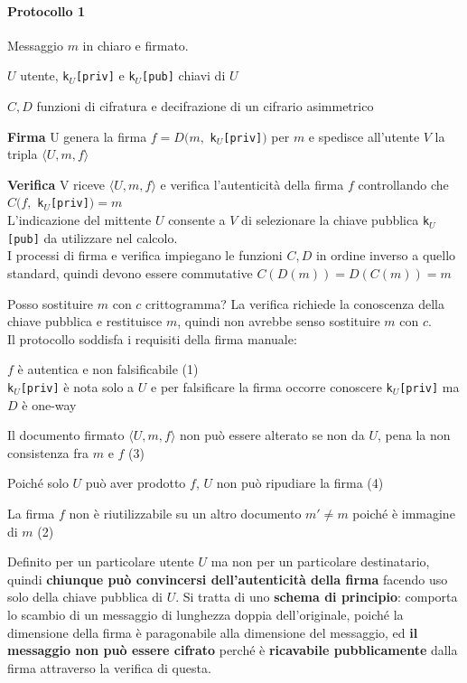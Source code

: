 \documentclass[10pt]{book}
\begin{document}
\paragraph{Protocollo 1} Messaggio $m$ in chiaro e firmato.
\begin{list}{}{}
	\item $U$ utente, \texttt{k$_U$[priv]} e \texttt{k$_U$[pub]} chiavi di $U$
	\item $C,D$ funzioni di cifratura e decifrazione di un cifrario asimmetrico
	\item \textbf{Firma} U genera la firma $f = D(m,$ \texttt{k$_U$[priv]}$)$ per $m$ e spedisce all'utente $V$ la tripla $\langle U,m,f\rangle$
	\pagebreak
	\item \textbf{Verifica} V riceve $\langle U,m,f\rangle$ e verifica l'autenticità della firma $f$ controllando che $C(f,$ \texttt{k$_U$[priv]}$) = m$\\
	L'indicazione del mittente $U$ consente a $V$ di selezionare la chiave pubblica \texttt{k$_U$[pub]} da utilizzare nel calcolo.\\
I processi di firma e verifica impiegano le funzioni $C,D$ in ordine inverso a quello standard, quindi devono essere commutative $C(D(m)) = D(C(m)) = m$	
\end{list}
Posso sostituire $m$ con $c$ crittogramma? La verifica richiede la conoscenza della chiave pubblica e restituisce $m$, quindi non avrebbe senso sostituire $m$ con $c$.\\
Il protocollo soddisfa i requisiti della firma manuale:
\begin{list}{}{}
	\item $f$ è autentica e non falsificabile (1)\\
	\texttt{k$_U$[priv]} è nota solo a $U$ e per falsificare la firma occorre conoscere \texttt{k$_U$[priv]} ma $D$ è one-way
	\item Il documento firmato $\langle U,m,f\rangle$ non può essere alterato se non da $U$, pena la non consistenza fra $m$ e $f$ (3)
	\item Poiché solo $U$ può aver prodotto $f$, $U$ non può ripudiare la firma (4)
	\item La firma $f$ non è riutilizzabile su un altro documento $m'\neq m$ poiché è immagine di $m$ (2)
\end{list}
Definito per un particolare utente $U$ ma non per un particolare destinatario, quindi \textbf{chiunque può convincersi dell'autenticità della firma} facendo uso solo della chiave pubblica di $U$. Si tratta di uno \textbf{schema di principio}: comporta lo scambio di un messaggio di lunghezza doppia dell'originale, poiché la dimensione della firma è paragonabile alla dimensione del messaggio, ed \textbf{il messaggio non può essere cifrato} perché è \textbf{ricavabile pubblicamente} dalla firma attraverso la verifica di questa.
\end{document}

